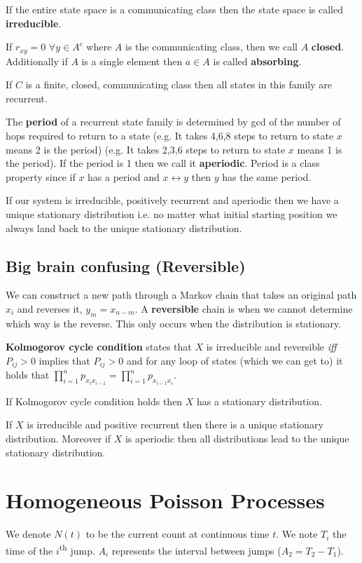 \documentclass[10pt,landscape,a4paper]{article}
\begin{document}
\begin{multicols*}{4}
If the entire state space is a communicating class then the state space is
called \textbf{irreducible}.

If $r_{xy} = 0$ $\forall y \in A^c$ where $A$ is the communicating class,
then we call $A$ \textbf{closed}. Additionally if $A$ is a single element
then $a \in A$ is called \textbf{absorbing}.

If $C$ is a finite, closed, communicating class then all states in this
family are recurrent.

The \textbf{period} of a recurrent state family is determined by gcd 
of the number of
hops required to return to a state (e.g. It takes 4,6,8 steps to return
to state $x$ means 2 is the period) (e.g. It takes 2,3,6 steps to return to
state $x$ means 1 is the period). If the period is 1 then we call it
\textbf{aperiodic}. Period is a class property since if $x$ has a period and
$x \leftrightarrow y$ then $y$ has the same period.

If our system is irreducible, positively recurrent and aperiodic then we
have a unique stationary distribution i.e. no matter what initial starting
position we always land back to the unique stationary distribution.
\subsection{Big brain confusing (Reversible)}
We can construct a new path through a Markov chain that takes an original
path $x_i$ and reverses it, $y_m = x_{n-m}$.
A \textbf{reversible} chain is when we cannot determine which way is the
reverse. This only occurs when the distribution is stationary.

\textbf{Kolmogorov cycle condition} states that $X$ is irreducible and
reversible \emph{iff} $P_{ij} > 0$ implies that $P_{ij} > 0$ and for any
loop of states (which we can get to) it holds that
$\prod_{i=1}^n p_{x_i x_{i-1}} = \prod_{i=1}^n p_{x_{i-1} x_i}$.

If Kolmogorov cycle condition holds then $X$ has a stationary distribution.

If $X$ is irreducible and positive recurrent then there is a unique
stationary distribution. Moreover if $X$ is aperiodic then all distributions
lead to the unique stationary distribution.

\section{Homogeneous Poisson Processes}
We denote $N(t)$ to be the current count at continuous time $t$.
We note $T_i$ the time of the $i$\textsuperscript{th} jump.
$A_i$ represents the interval between jumps ($A_2 = T_2 - T_1$).


\end{multicols*}
\end{document}
